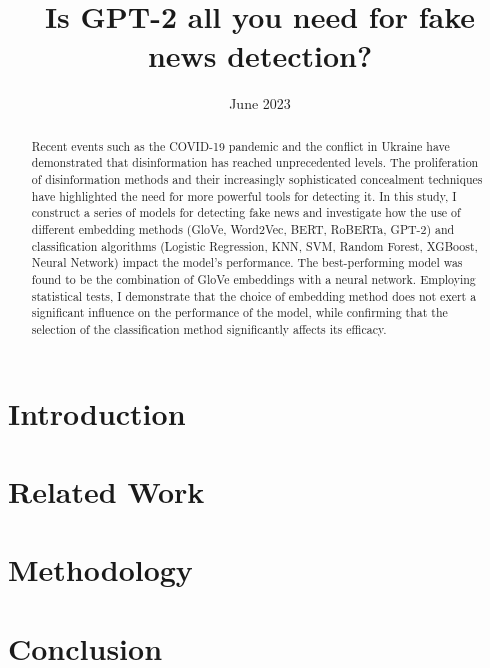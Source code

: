 \documentclass[magisterska,en]{mgr}
\title{Is GPT-2 all you need for fake news detection?}
\date{June 2023}
\begin{document}
\maketitle

\begin{abstract}
    Recent events such as the COVID-19 pandemic and the conflict in Ukraine have demonstrated that disinformation has reached unprecedented levels. The proliferation of disinformation methods and their increasingly sophisticated concealment techniques have highlighted the need for more powerful tools for detecting it. 
    In this study, I construct a series of models for detecting fake news and investigate how the use of different embedding methods (GloVe, Word2Vec, BERT, RoBERTa, GPT-2) and classification algorithms (Logistic Regression, KNN, SVM, Random Forest, XGBoost, Neural Network) impact the model's performance. The best-performing model was found to be the combination of GloVe embeddings with a neural network. Employing statistical tests, I demonstrate that the choice of embedding method does not exert a significant influence on the performance of the model, while confirming that the selection of the classification method significantly affects its efficacy.
\end{abstract}

\tableofcontents

\chapter*{Introduction}


\chapter{Related Work}\label{r:related_work}


\chapter{Methodology}\label{r:methodology}


\chapter{Conclusion}\label{r:conclusion}


\appendix

\printbibliography[heading=bibintoc]
\end{document}
